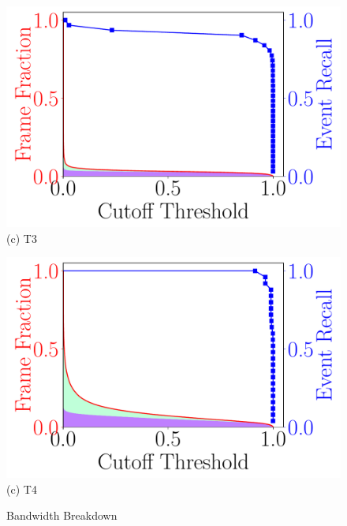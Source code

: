 \begin{figure}
    \vspace{.5in}

    \begin{minipage}[]{0.45\linewidth}
        \centering
        \includegraphics[width=\linewidth]{FIGS/fig-event-recall-frame-percentage-vs-threshold-raft.pdf}\\
        {(c) T3}
    \end{minipage}
    \begin{minipage}[]{0.45\linewidth}
        \centering
        \includegraphics[width=\linewidth]{FIGS/fig-event-recall-frame-percentage-vs-threshold-elephant.pdf}\\
        {(c) T4}
    \end{minipage}

    \vspace{.5in}
    \caption{Bandwidth Breakdown}
    \label{fig:earlydiscard-frame-percent-breakdown}
\end{figure}

